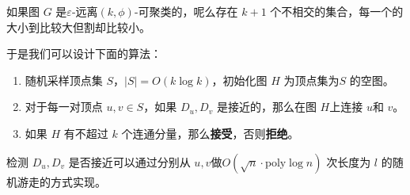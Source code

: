 如果图 $G$ 是$\varepsilon$-远离$(k,\phi)$-可聚类的，呢么存在 $k+1$ 个不相交的集合，每一个的大小到比较大但割却比较小。

于是我们可以设计下面的算法：
\begin{enumerate}
    \item 随机采样顶点集 $S$，$|S|=O(k\log k)$，初始化图 $H$ 为顶点集为$S$ 的空图。
    \item 对于每一对顶点 $u,v\in S$，如果 $D_u,D_v$ 是接近的，那么在图 $H$上连接 $u$和 $v$。
    \item 如果 $H$ 有不超过 $k$ 个连通分量，那么\textbf{接受}，否则\textbf{拒绝}。
\end{enumerate}

检测 $D_u,D_v$ 是否接近可以通过分别从 $u,v$做$O(\sqrt{n}\cdot\mathrm{poly}\log n)$ 次长度为 $l$ 的随机游走的方式实现。
